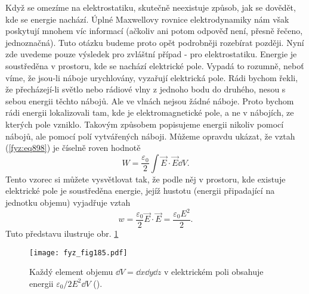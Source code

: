     Když se omezíme na elektrostatiku, skutečně neexistuje způsob, jak se dovědět, kde se energie
    nachází. Úplné Maxwellovy rovnice elektrodynamiky nám však poskytují mnohem víc informací
    (ačkoliv ani potom odpověď není, přesně řečeno, jednoznačná). Tuto otázku budeme proto opět
    podrobněji rozebírat později. Nyní zde uvedeme pouze výsledek pro zvláštní případ - pro
    elektrostatiku. Energie je soustředěna v prostoru, kde se nachází elektrické pole. Vypadá to
    rozumně, neboť víme, že jsou-li náboje urychlovány, vyzařují elektrická pole. Rádi bychom řekli,
    že přecházejí-li světlo nebo rádiové vlny z jednoho bodu do druhého, nesou s sebou energii
    těchto nábojů. Ale ve vlnách nejsou žádné náboje. Proto bychom rádi energii lokalizovali tam,
    kde je elektromagnetické pole, a ne v nábojích, ze kterých pole vzniklo. Takovým způsobem
    popisujeme energii nikoliv pomocí nábojů, ale pomocí polí vytvářených náboji. Můžeme opravdu
    ukázat, že vztah (\ref{fyz:eq898}) je číselně roven hodnotě
    \begin{equation}\label{fyz:eq900}
      W=\dfrac{\varepsilon_0}{2}\int\vec{E}\cdot\vec{E}\dd{V}.
    \end{equation}
    Tento vzorec si můžete vysvětlovat tak, že podle něj v prostoru, kde existuje elektrické pole je
    soustředěna energie, jejíž hustotu (energii připadající na jednotku objemu) vyjadřuje vztah
    \begin{equation}\label{fyz:eq901}
      w=\dfrac{\varepsilon_0}{2}\vec{E}\cdot\vec{E}=\dfrac{\varepsilon_0E^2}{2}.
    \end{equation}
    Tuto představu ilustruje obr. \ref{fyz:fig185}

    \begin{figure}[ht!]  %
      \centering
      \texttt{[image: fyz\_fig185.pdf]}
      \caption{Každý element objemu \(\dd{V} = \dd{x}\dd{y}\dd{z}\) v elektrickém  poli obsahuje
      energii \(\varepsilon_0/2E^2\dd{V}\) (\cite[s.~154]{Feynman02}).}
      \label{fyz:fig185}
    \end{figure}

